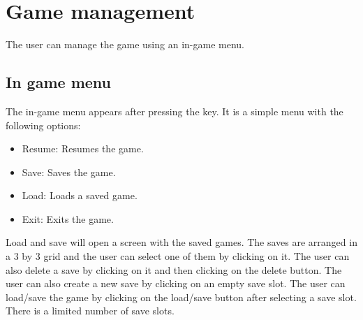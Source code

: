 \section{Game management}

The user can manage the game using an in-game menu.

\subsection{In game menu}
The in-game menu appears after pressing the \keys{\escwin} key.
It is a simple menu with the following options:

\begin{itemize}
    \item Resume: Resumes the game.
    \item Save: Saves the game.
    \item Load: Loads a saved game.
    \item Exit: Exits the game.
\end{itemize}

Load and save will open a screen with the saved games.
The saves are arranged in a 3 by 3 grid and the user can select one of them by clicking on it.
The user can also delete a save by clicking on it and then clicking on the delete button.
The user can also create a new save by clicking on an empty save slot.
The user can load/save the game by clicking on the load/save button after selecting a save slot.
There is a limited number of save slots.
